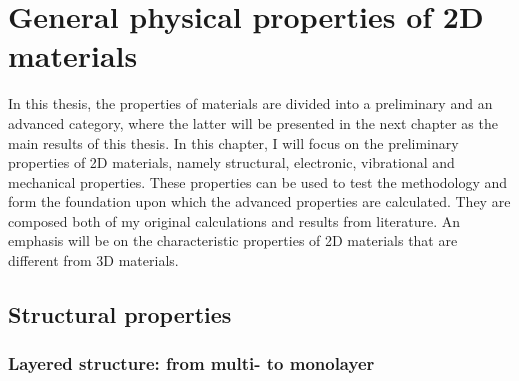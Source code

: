 
\chapter{General physical properties of 2D materials \label{chap:3}}

\ifpdf
    \graphicspath{{Chapter3/Figs/Raster/}{Chapter3/Figs/PDF/}{Chapter3/Figs/}{Chapter3/Figs/Vector/}}
\else
    \graphicspath{{Chapter3/Figs/Vector/}{Chapter3/Figs/}}
\fi

In this thesis, the properties of materials are divided into a preliminary and an advanced category, where the latter will be presented in the next chapter as the main results of this thesis. In this chapter, I will focus on the preliminary properties of 2D materials, namely structural, electronic, vibrational and mechanical properties. These properties can be used to test the methodology and form the foundation upon which the advanced properties are calculated. They are composed both of my original calculations and results from literature. An emphasis will be on the characteristic properties of 2D materials that are different from 3D materials.

\section{Structural properties}
\subsection{Layered structure: from multi- to monolayer}

